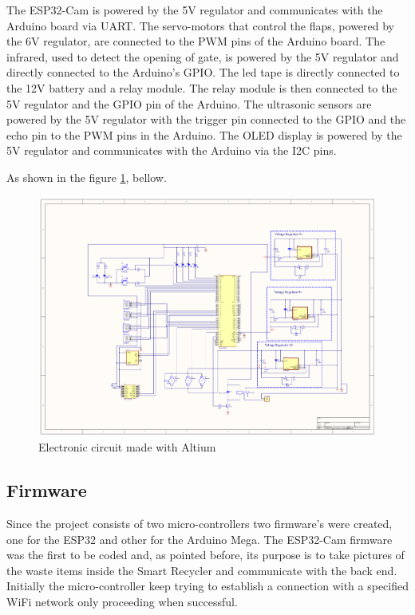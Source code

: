\documentclass[a4paper,11pt]{article}
\begin{document}
The ESP32-Cam is powered by the 5V regulator and communicates with the Arduino board via UART. The servo-motors that control the flaps, powered by the 6V regulator, are connected to the PWM pins of the Arduino board. The infrared, used to detect the opening of gate, is powered by the 5V regulator and directly connected to the Arduino's GPIO. The led tape is directly connected to the 12V battery and a relay module. The relay module is then connected to the 5V regulator and the GPIO pin of the Arduino. The ultrasonic sensors are powered by the 5V regulator with the trigger pin connected to the GPIO and the echo pin to the PWM pins in the Arduino. The OLED display is powered by the 5V regulator and communicates with the Arduino via the I2C pins.

As shown in the figure \ref{fig:circuit}, bellow.

\begin{figure}[H]
  \centering
  \includegraphics[width=17.8cm, angle=-90]{Figures/Eletronical Circuit.pdf}
  \caption{\small{Electronic circuit made with Altium}}
  \label{fig:circuit}
\end{figure}

\subsection{Firmware}
Since the project consists of two micro-controllers two firmware's were created, one for the ESP32 and other for the Arduino Mega. The ESP32-Cam firmware was the first to be coded and, as pointed before, its purpose is to take pictures of the waste items inside the Smart Recycler and communicate with the back end. Initially the micro-controller keep trying to establish a connection with a specified WiFi network only proceeding when successful.
\end{document}
